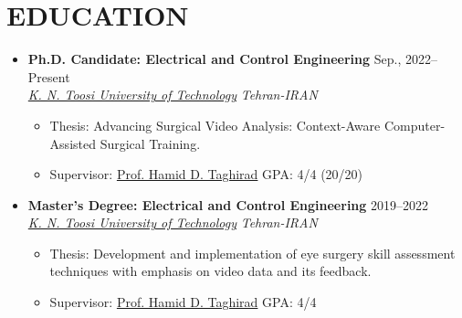 \documentclass[11pt,a4paper,sans]{moderncv} %
\begin{document}
	\section{EDUCATION}

 

	\begin{itemize}
		\item \textbf{Ph.D. Candidate: Electrical and Control Engineering} \hfill Sep., 2022--Present \\ 
		\href{https://en.kntu.ac.ir/}{ \emph{K. N. Toosi University of Technology}} \hfill \emph{Tehran-IRAN}
		\begin{itemize}
   \item Thesis: Advancing Surgical Video Analysis: Context-Aware Computer-Assisted Surgical Training.
            \item {Supervisor: \href{https://aras.kntu.ac.ir/taghirad/}{Prof. Hamid D. Taghirad}} \hspace{10 pt}  \hspace{10 pt}   \hfill  GPA: 4/4 (20/20)
   
		\end{itemize}
		
		\vspace{1em}
		\item \textbf{Master's Degree: Electrical and Control Engineering} \hfill 2019--2022 \\
		\href{https://en.kntu.ac.ir/}{ \emph{K. N. Toosi University of Technology}} \hfill \emph{Tehran-IRAN}
		
		\begin{itemize}
   \item Thesis: Development and implementation of eye surgery skill assessment techniques with emphasis on video data and its feedback.
   \item {Supervisor: \href{https://aras.kntu.ac.ir/taghirad/}{Prof. Hamid D. Taghirad}}  \hspace{10 pt}  \hspace{10 pt}  \hfill  GPA: 4/4 
		\end{itemize}


\end{itemize}
\end{document}
